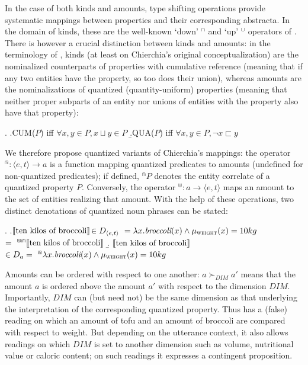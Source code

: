 \documentclass[a4paper,12pt,twoside]{article}
\newcommand{\sv}[1]{\ensuremath{\llbracket\textnormal{#1}\rrbracket}}
\newcommand{\red}[1]{\textcolor{red}{\sffamily#1}}
\begin{document}
	In the case of  both kinds and amounts, type shifting operations provide systematic mappings between properties and their corresponding abstracta. In the domain of kinds, these are the well-known `down' $^{\cap}$ and `up' $^{\cup}$ operators of \citet{Chierchia:1998}. There is however a crucial distinction between kinds and amounts: in the terminology of \citet{Krifka:1989}, kinds (at least on Chierchia's original conceptualization) are the nominalized counterparts of properties with cumulative reference (meaning that if any two entities have the property, so too does their union), whereas amounts are the nominalizations of quantized (quantity-uniform) properties (meaning that neither proper subparts of an entity nor unions of entities with the property also have that property):
	
	
	\ex.
	\a.CUM($P$) iff $\forall x,y  \in P, x \sqcup y \in P$ %
	\b.QUA($P$) iff $\forall x,y \in P, \neg x \sqsubset y$ %
	
	\noindent We therefore propose quantized variants of Chierchia's  mappings: the operator $^{\Cap}: \langle e,t\rangle \rightarrow a$ is a function mapping quantized predicates to amounts (undefined for non-quantized predicates); if defined, $^{\Cap}P$ denotes the entity correlate of a quantized property $P$. Conversely, the operator $^{\Cup}: a \rightarrow \langle e,t\rangle$ maps an amount to the set of entities realizing that amount. With the help of these operations, two distinct denotations of quantized noun phrases can be stated:
	
	\ex.\label{ints}
	\a.\label{ints:a}\sv{ten kilos of broccoli}$\in D_{\langle e,t\rangle} \ = \lambda x . \textit{broccoli}(x) \wedge \mu_{\textsc{weight}}(x) = 10kg$ \\ $=\ ^{\Cup\Cap}\sv{ten kilos of broccoli}$%
	\b.\label{ints:b} \sv{ten kilos of broccoli}$\in D_{a} = \ ^{\Cap}\lambda x . \textit{broccoli}(x) \wedge \mu_{\textsc{weight}}(x) = 10kg$
	
	
	Amounts can be ordered with respect to one another: $a \succ_{DIM} a'$ means that the amount $a$ is ordered above the amount $a'$ with respect to the dimension $DIM$. Importantly, $DIM$ can (but need not) be the same dimension as that underlying the  interpretation of the corresponding quantized property. Thus \Next has a (false) reading on which an amount of tofu and an amount of broccoli are compared with respect to weight. But depending on the utterance context, it also allows readings on which $DIM$ is set to another dimension such as volume, nutritional value or caloric content; on such readings it expresses a contingent proposition.
	
\end{document}
